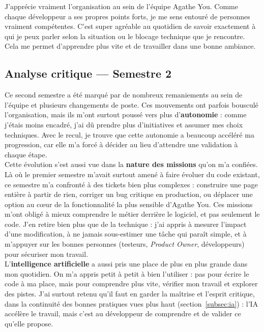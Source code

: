 \documentclass{article}
\begin{document}
J'apprécie vraiment l'organisation au sein de l'équipe Agathe You. Comme chaque développeur a ses propres points forts, je me sens entouré de personnes vraiment compétentes. C'est super agréable au quotidien de savoir exactement à qui je peux parler selon la situation ou le blocage technique que je rencontre. Cela me permet d'apprendre plus vite et de travailler dans une bonne ambiance.

\subsection{Analyse critique --- Semestre 2}
\label{subsec:analyse-s2}

Ce second semestre a été marqué par de nombreux remaniements au sein de l'équipe et plusieurs changements de poste. Ces mouvements ont parfois bousculé l'organisation, mais ils m'ont surtout poussé vers plus d'\textbf{autonomie} : comme j'étais moins encadré, j'ai dû prendre plus d'initiatives et assumer mes choix techniques. Avec le recul, je trouve que cette autonomie a beaucoup accéléré ma progression, car elle m'a forcé à décider au lieu d'attendre une validation à chaque étape.\\

Cette évolution s'est aussi vue dans la \textbf{nature des missions} qu'on m'a confiées. Là où le premier semestre m'avait surtout amené à faire évoluer du code existant, ce semestre m'a confronté à des tickets bien plus complexes : construire une page entière à partir de rien, corriger un bug critique en production, ou déplacer une option au cœur de la fonctionnalité la plus sensible d'Agathe You. Ces missions m'ont obligé à mieux comprendre le métier derrière le logiciel, et pas seulement le code. J'en retire bien plus que de la technique : j'ai appris à mesurer l'impact d'une modification, à ne jamais sous-estimer une tâche qui paraît simple, et à m'appuyer sur les bonnes personnes (testeurs, \textit{Product Owner}, développeurs) pour sécuriser mon travail.\\

L'\textbf{intelligence artificielle} a aussi pris une place de plus en plus grande dans mon quotidien. On m'a appris petit à petit à bien l'utiliser : pas pour écrire le code à ma place, mais pour comprendre plus vite, vérifier mon travail et explorer des pistes. J'ai surtout retenu qu'il faut en garder la maîtrise et l'esprit critique, dans la continuité des bonnes pratiques vues plus haut (section~\ref{subsec:ia}) : l'IA accélère le travail, mais c'est au développeur de comprendre et de valider ce qu'elle propose.\\
\end{document}
